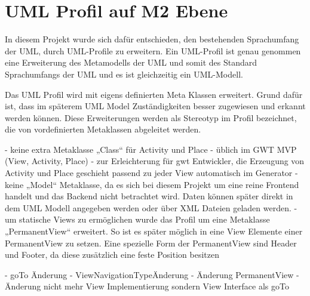 \chapter{UML Profil auf M2 Ebene}
\label{UMLProfil}
In diesem Projekt wurde sich dafür entschieden, den bestehenden Sprachumfang der UML, durch UML-Profile zu erweitern. Ein UML-Profil ist genau genommen eine Erweiterung des Metamodells der UML und somit des Standard Sprachumfangs der UML und es ist gleichzeitig ein UML-Modell.

Das UML Profil wird mit eigens definierten Meta Klassen erweitert. Grund
dafür ist, dass im späterem UML Model Zuständigkeiten besser zugewiesen und
erkannt werden können.
Diese Erweiterungen werden als Stereotyp im Profil bezeichnet, die von vordefinierten Metaklassen abgeleitet werden.

- keine extra Metaklasse „Class“ für Activity und Place
	- üblich im GWT MVP (View, Activity, Place)   
	- zur Erleichterung für gwt Entwickler, die Erzeugung von Activity 	und Place geschieht passend zu jeder View automatisch im Generator
- keine „Model“ Metaklasse, da es sich bei diesem Projekt um eine reine Frontend handelt und das Backend nicht betrachtet wird. Daten können später direkt in dem UML Modell angegeben werden oder über XML Dateien geladen werden.
- um statische Views zu ermöglichen wurde das Profil um eine Metaklasse „PermanentView“ 
erweitert. So ist es später möglich in eine View Elemente einer PermanentView zu setzen. Eine spezielle Form der PermanentView sind Header und Footer, da diese zusätzlich eine feste Position besitzen




- goTo Änderung
- ViewNavigationTypeÄnderung
- Änderung PermanentView
- Änderung nicht mehr View Implementierung sondern View Interface als goTo